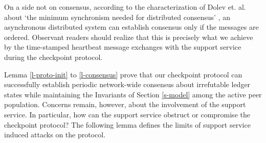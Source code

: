 On a side not on consensus, according to the characterization of Dolev et. al. about `the minimum synchronism needed for distributed consensus' \cite{Dolev:1987:MSN:7531.7533}, an asynchronous distributed system can establish consensus only if the messages are ordered. Observant readers should realize that this is precisely what we achieve by the time-stamped heartbeat message exchanges with the support service during the checkpoint protocol. 

Lemma \ref{l-proto-init} to \ref{l-consensus} prove that our checkpoint protocol can successfully establish periodic network-wide consensus about irrefutable ledger states while maintaining the Invariants of Section \ref{s-model} among the active peer population. Concerns remain, however, about the involvement of the support service. In particular, how can the support service obstruct or compromise the checkpoint protocol? The following lemma defines the limits of support service induced attacks on the protocol.

